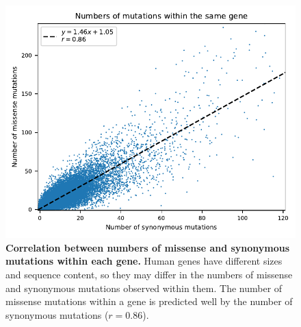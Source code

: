 \documentclass[]{article}
\begin{document}
\begin{figure}[ht!]
    \centering
    \includegraphics{../figures/mutations_in_genes}
    \caption{
        \textbf{Correlation between numbers of missense and synonymous mutations
        within each gene.}
        Human genes have different sizes and sequence content, so they may differ in the
        numbers of missense and synonymous mutations observed within them.
        The number of missense mutations within a gene is predicted well by
        the number of synonymous mutations (\(r=0.86\)).
    }
    \label{fig:mutCorrGene}
\end{figure}
\end{document}
